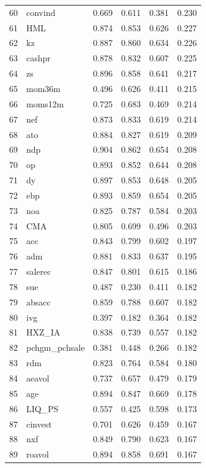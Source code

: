 \documentclass[12pt]{article}
\begin{document}
\begin{footnotesize}
\begin{longtable}{rl|c|c|c|c}
		60 & convind & 0.669 & 0.611 & 0.381 & 0.230 \\ 
		61 & HML & 0.874 & 0.853 & 0.626 & 0.227 \\ 
		62 & kz & 0.887 & 0.860 & 0.634 & 0.226 \\ 
		63 & cashpr & 0.878 & 0.832 & 0.607 & 0.225 \\ 
		64 & zs & 0.896 & 0.858 & 0.641 & 0.217 \\ 
		65 & mom36m & 0.496 & 0.626 & 0.411 & 0.215 \\ 
		66 & moms12m & 0.725 & 0.683 & 0.469 & 0.214 \\ 
		67 & nef & 0.873 & 0.833 & 0.619 & 0.214 \\ 
		68 & ato & 0.884 & 0.827 & 0.619 & 0.209 \\ 
		69 & ndp & 0.904 & 0.862 & 0.654 & 0.208 \\ 
		70 & op & 0.893 & 0.852 & 0.644 & 0.208 \\ 
		71 & dy & 0.897 & 0.853 & 0.648 & 0.205 \\ 
		72 & ebp & 0.893 & 0.859 & 0.654 & 0.205 \\ 
		73 & noa & 0.825 & 0.787 & 0.584 & 0.203 \\ 
		74 & CMA & 0.805 & 0.699 & 0.496 & 0.203 \\ 
		75 & acc & 0.843 & 0.799 & 0.602 & 0.197 \\ 
		76 & adm & 0.881 & 0.833 & 0.637 & 0.195 \\ 
		77 & salerec & 0.847 & 0.801 & 0.615 & 0.186 \\ 
		78 & sue & 0.487 & 0.230 & 0.411 & 0.182 \\ 
		79 & absacc & 0.859 & 0.788 & 0.607 & 0.182 \\ 
		80 & ivg & 0.397 & 0.182 & 0.364 & 0.182 \\ 
		81 & HXZ\_IA & 0.838 & 0.739 & 0.557 & 0.182 \\ 
		82 & pchgm\_pchsale & 0.381 & 0.448 & 0.266 & 0.182 \\ 
		83 & rdm & 0.823 & 0.764 & 0.584 & 0.180 \\ 
		84 & aeavol & 0.737 & 0.657 & 0.479 & 0.179 \\ 
		85 & age & 0.894 & 0.847 & 0.669 & 0.178 \\ 
		86 & LIQ\_PS & 0.557 & 0.425 & 0.598 & 0.173 \\ 
		87 & cinvest & 0.701 & 0.626 & 0.459 & 0.167 \\ 
		88 & nxf & 0.849 & 0.790 & 0.623 & 0.167 \\ 
		89 & roavol & 0.894 & 0.858 & 0.691 & 0.167 \\ 

\end{longtable}
\end{footnotesize}
\end{document}
